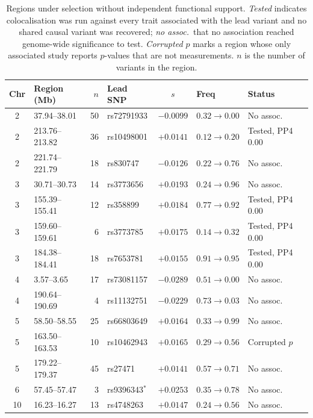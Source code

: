 \documentclass{article}
\begin{document}
\begin{table}[t]
    \centering\footnotesize
    \setlength{\tabcolsep}{3pt}
    \caption{Regions under selection without independent functional support.
    \emph{Tested} indicates colocalisation was run against every trait associated
    with the lead variant and no shared causal variant was recovered;
    \emph{no assoc.}\ that no association reached genome-wide significance to test.
    \emph{Corrupted $p$} marks a region whose only associated study reports
    $p$-values that are not measurements. $n$ is the number of variants in the region.}
    \label{tab:unsupported}
    \begin{tabular}{@{}clrlcl>{\raggedright\arraybackslash}p{2.3cm}@{}}
    \toprule
    Chr & Region (Mb) & $n$ & Lead SNP & $s$ & Freq & Status \\
    \midrule
    2  & 37.94--38.01   & 50 & rs72791933  & $-0.0099$ & $0.32\!\to\!0.00$ & No assoc. \\
    2  & 213.76--213.82 & 36 & rs10498001  & $+0.0141$ & $0.12\!\to\!0.20$ & Tested, PP4 0.00 \\
    2  & 221.74--221.79 & 18 & rs830747    & $-0.0126$ & $0.22\!\to\!0.76$ & No assoc. \\
    3  & 30.71--30.73   & 14 & rs3773656   & $+0.0193$ & $0.24\!\to\!0.96$ & No assoc. \\
    3  & 155.39--155.41 & 12 & rs358899    & $+0.0184$ & $0.77\!\to\!0.92$ & Tested, PP4 0.00 \\
    3  & 159.60--159.61 & 6  & rs3773785   & $+0.0175$ & $0.14\!\to\!0.32$ & Tested, PP4 0.00 \\
    3  & 184.38--184.41 & 18 & rs7653781   & $+0.0155$ & $0.91\!\to\!0.95$ & Tested, PP4 0.00 \\
    4  & 3.57--3.65     & 17 & rs73081157  & $-0.0289$ & $0.51\!\to\!0.00$ & No assoc. \\
    4  & 190.64--190.69 & 4  & rs11132751  & $-0.0229$ & $0.73\!\to\!0.03$ & No assoc. \\
    5  & 58.50--58.55   & 25 & rs66803649  & $+0.0164$ & $0.33\!\to\!0.99$ & No assoc. \\
    5  & 163.50--163.53 & 10 & rs10462943  & $+0.0165$ & $0.29\!\to\!0.56$ & Corrupted $p$ \\
    5  & 179.22--179.37 & 45 & rs27471     & $+0.0141$ & $0.57\!\to\!0.71$ & No assoc. \\
    6  & 57.45--57.47   & 3  & rs9396343$^{*}$ & $+0.0253$ & $0.35\!\to\!0.78$ & No assoc. \\
    10 & 16.23--16.27   & 13 & rs4748263   & $+0.0147$ & $0.24\!\to\!0.56$ & No assoc. \\

\end{tabular}
\end{table}
\end{document}

